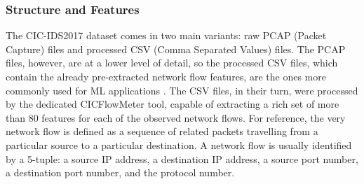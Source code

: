 \subsubsection{Structure and Features} 
The CIC-IDS2017 dataset comes in two main variants: raw PCAP (Packet Capture) files and processed CSV (Comma Separated Values) files. The PCAP files, however, are at a lower level of detail, so the processed CSV files, which contain the already pre-extracted network flow features, are the ones more commonly used for ML applications \parencite {sharafaldin2018toward}. The CSV files, in their turn, were processed by the dedicated CICFlowMeter tool, capable of extracting a rich set of more than 80 features for each of the observed network flows. For reference, the very network flow is defined as a sequence of related packets travelling from a particular source to a particular destination. A network flow is usually identified by a 5-tuple: a source IP address, a destination IP address, a source port number, a destination port number, and the protocol number.


